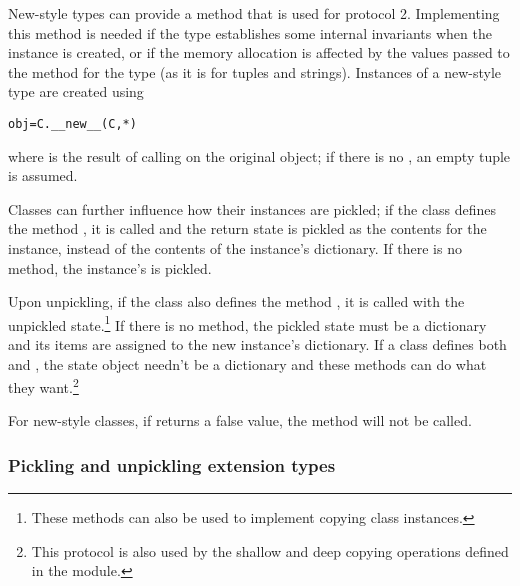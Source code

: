 
New-style types can provide a  method that is
used for protocol 2.  Implementing this method is needed if the type
establishes some internal invariants when the instance is created, or
if the memory allocation is affected by the values passed to the
 method for the type (as it is for tuples and
strings).  Instances of a new-style type  are created using

\begin{alltt}
obj = C.__new__(C, *)
\end{alltt}

where  is the result of calling  on
the original object; if there is no , an
empty tuple is assumed.


Classes can further influence how their instances are pickled; if the
class defines the method , it is called and the
return state is pickled as the contents for the instance, instead of
the contents of the instance's dictionary.  If there is no
 method, the instance's  is
pickled.

Upon unpickling, if the class also defines the method
, it is called with the unpickled
state.\footnote{These methods can also be used to implement copying
class instances.}  If there is no  method, the
pickled state must be a dictionary and its items are assigned to the
new instance's dictionary.  If a class defines both
 and , the state object
needn't be a dictionary and these methods can do what they
want.\footnote{This protocol is also used by the shallow and deep
copying operations defined in the
 module.}

\begin{notice}[warning]
  For new-style classes, if  returns a false
  value, the  method will not be called.
\end{notice}


\subsubsection{Pickling and unpickling extension types}

